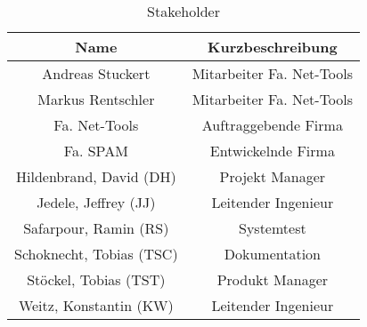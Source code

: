 \begin{table}[htdp]
\caption{Stakeholder}
\label{tab:stakeholder}
\begin{center}
\begin{tabular}{|c|c|}
\hline
\textbf{Name} & \textbf{Kurzbeschreibung}\\
\hline
Andreas Stuckert & Mitarbeiter Fa. Net-Tools \\
\hline
Markus Rentschler & Mitarbeiter Fa. Net-Tools \\
\hline
Fa. Net-Tools & Auftraggebende Firma \\
\hline
Fa. SPAM & Entwickelnde Firma \\
\hline
Hildenbrand, David (DH) & Projekt Manager\\
\hline
Jedele, Jeffrey (JJ) & Leitender Ingenieur\\
\hline
Safarpour, Ramin (RS) & Systemtest\\
\hline
Schoknecht, Tobias (TSC) & Dokumentation\\
\hline
Stöckel, Tobias (TST) & Produkt Manager\\
\hline
Weitz, Konstantin (KW) & Leitender Ingenieur\\
\hline
\end{tabular}
\end{center}
\label{default}
\end{table}
